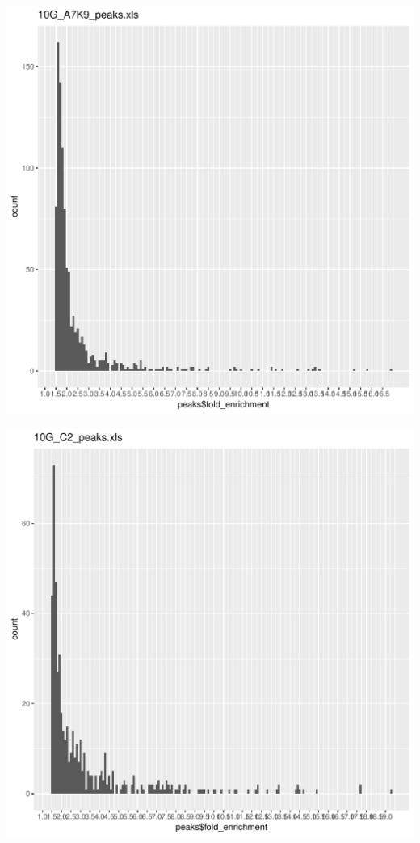 \documentclass{article}\usepackage[]{graphicx}\usepackage[]{color}
\makeatletter
\def\maxwidth{ %
  \ifdim\Gin@nat@width>\linewidth
    \linewidth
  \else
    \Gin@nat@width
  \fi
}
\newenvironment{knitrout}{}{} %
\makeatother
\begin{document}
\begin{knitrout}
\includegraphics[width=\maxwidth]{figure/unnamed-chunk-2-2} 

\includegraphics[width=\maxwidth]{figure/unnamed-chunk-2-3} 


\end{knitrout}
\end{document}
